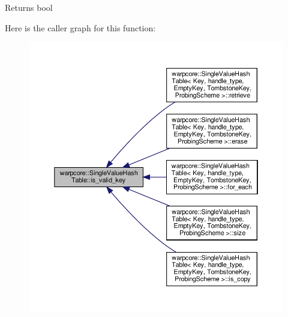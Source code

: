 \begin{DoxyReturn}{Returns}
{\ttfamily bool} 
\end{DoxyReturn}
Here is the caller graph for this function\+:
\nopagebreak
\begin{figure}[H]
\begin{center}
\leavevmode
\includegraphics[width=350pt]{classwarpcore_1_1SingleValueHashTable_afc6413d2fe78d491628565025790c0fe_icgraph}
\end{center}
\end{figure}
\mbox{\label{classwarpcore_1_1SingleValueHashTable_afc3b7f76eec998a3d4878edf1ae1419b}} 
